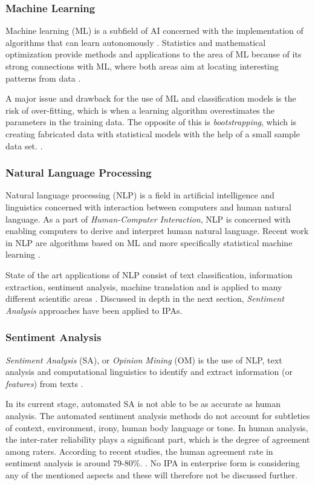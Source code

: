 \documentclass[preprint,12pt]{elsarticle}
\begin{document}
\subsubsection{Machine Learning}
Machine learning (ML) is a subfield of AI concerned with the implementation of algorithms that can learn autonomously \cite{russel2009}. Statistics and mathematical optimization provide methods and applications to the area of ML because of its strong connections with ML, where both areas aim at locating interesting patterns from data \cite{hand2001}.

A major issue and drawback for the use of ML and classification models is the risk of over-fitting, which is when a learning algorithm overestimates the parameters in the training data. The opposite of this is \textit{bootstrapping}, which is creating fabricated data with statistical models with the help of a small sample data set. \cite{ticknor2013}.

\subsubsection{Natural Language Processing}
Natural language processing (NLP) is a field in artificial intelligence and linguistics concerned with interaction between computers and human natural language.
As a part of \textit{Human-Computer Interaction}, NLP is concerned with enabling computers to derive and interpret human natural language. Recent work in NLP are algorithms based on ML and more specifically statistical machine learning \cite{russel2009,google2015}.

State of the art applications of NLP consist of text classification, information extraction, sentiment analysis, machine translation and is applied to many different scientific areas \cite{google2015}. Discussed in depth in the next section, \textit{Sentiment Analysis} approaches have been applied to IPAs.

\subsubsection{Sentiment Analysis}
\textit{Sentiment Analysis} (SA), or \textit{Opinion Mining} (OM) is the use of NLP, text analysis and computational linguistics to identify and extract information (or \textit{features}) from texts \cite{doan2014}.

In its current stage, automated SA is not able to be as accurate as human analysis. The automated sentiment analysis methods do not account for subtleties of context, environment, irony, human body language or tone. In human analysis, the inter-rater reliability plays a significant part, which is the degree of agreement among raters. According to recent studies, the human agreement rate in sentiment analysis is around 79-80\%. 
\cite{pak2010,wiebe2005,mashable2010}. No IPA in enterprise form is considering any of the mentioned aspects and these will therefore not be discussed further.
\end{document}
